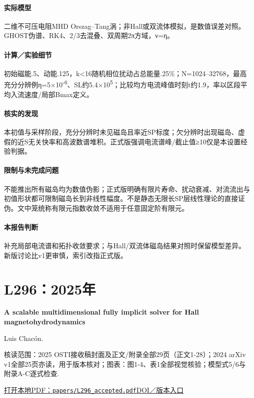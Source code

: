 \documentclass[UTF8,a4paper,11pt,openany,fontset=fandol]{ctexbook}
\begin{document}
\paragraph{实际模型}二维不可压电阻MHD Orszag–Tang涡；非Hall或双流体模拟，是数值误差对照。GHOST伪谱、RK4、2/3去混叠、双周期2π方域，ν=η。

\paragraph{计算／实验细节}初始磁能.5、动能.125，k<16随机相位扰动占总能量.25\%；N=1024–32768，最高充分分辨例η=5×10\textsuperscript{-6}、SL约5.4×10\textsuperscript{5}；比较均方电流峰值时刻t约1.9，率以区段平均入流速度/局部Bmax定义。

\paragraph{核实的发现}本初值与采样阶段，充分分辨时未见磁岛且率近SP标度；欠分辨时出现磁岛、虚假的近S无关快率和高波数谱堆积。正式版强调电流谱峰/截止值≥10仅是本设置经验判据。

\paragraph{限制与未完成问题}不能推出所有磁岛均为数值伪影；正式版明确有限片寿命、扰动衰减、对流流出与初值形状都可限制磁岛长到非线性幅度。不是静态无限长SP层线性理论的直接证伪。文中笼统称有限元指数收敛不适用于任意固定阶有限元。

\paragraph{本报告判断}补充局部电流谱和拓扑收敛要求；与Hall/双流体磁岛结果对照时保留模型差异。新版讨论比v1更审慎，索引改指正式版。

\section{L296：2025年}\label{paper:L296}

\textbf{A scalable multidimensional fully implicit solver for Hall magnetohydrodynamics}\citep{L296}\

Luis Chacón.

\textsf{核读范围：}2025 OSTI接收稿封面及正文/附录全部29页（正文1-28）；2024 arXiv v1全部25页亦读，用于版本核对；\textsf{图表：}图1-4、表1全部视觉核验；模型式5/6与附录A-C逐式检查.

\href{run:../papers/L296_accepted.pdf}{打开本地PDF：\texttt{papers/L296\_accepted.pdf}}\quad\href{https://doi.org/10.1016/j.jcp.2025.113789}{DOI／版本入口}
\end{document}
